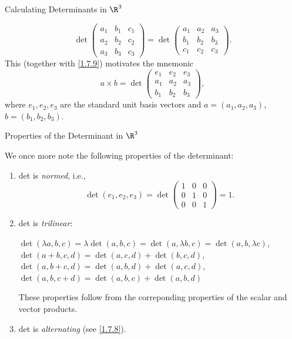 \documentclass[smaller,hyperref={CJKbookmarks=true}]{beamer}
\begin{document}
\begin{frame}{Calculating Determinants in $\R^3$}
\begin{spacing}{1}
\[\det\begin{pmatrix}
        a_1 & b_1 & c_1 \\
        a_2 & b_2 & c_2 \\
        a_3 & b_3 & c_3
      \end{pmatrix}=\det\begin{pmatrix}
                          a_1 & a_2 & a_3\\
                          b_1 & b_2 & b_3\\
                          c_1 & c_2 & c_3
                        \end{pmatrix}.\]
This (together with \eqref{1.7.9}) motivates the mnemonic
\[a\times b=\det\begin{pmatrix}
                  e_1 & e_2 & e_3 \\
                  a_1 & a_2 & a_3 \\
                  b_1 & b_2 & b_3
                \end{pmatrix},\]
where $e_1,e_2,e_3$ are the standard unit basis vectors and $a=(a_1,a_2,a_3)$,\\$b=(b_1,b_2,b_3)$.
\end{spacing}
\end{frame}
\begin{frame}[t]{Properties of the Determinant in $\R^3$}
\begin{spacing}{1.1}
We once more note the following properties of the determinant:
\begin{enumerate}[1.]
  \item det is \emph{normed}, i.e.,
  \[\det(e_1,e_2,e_3)=\det\begin{pmatrix}
                            1 & 0 & 0\\
                             0& 1 & 0\\
                            0 & 0 & 1
                          \end{pmatrix}=1.\]
  \item det is \emph{trilinear}:
  \begin{center}
    $\det(\lambda a,b,c)=\lambda\det(a,b,c)=\det(a,\lambda b,c)=\det(a,b,\lambda c)$,\\
    $\det(a+b,c,d)=\det(a,c,d)+\det(b,c,d)$,\\
    $\det(a,b+c,d)=\det(a,b,d)+\det(a,c,d)$,\\
    $\det(a,b,c+d)=\det(a,b,c)+\det(a,b,d)$
  \end{center}
  These properties follow from the correponding properties of the scalar and vector products.
  \item det is \emph{alternating} (see \eqref{1.7.8}).
\end{enumerate}
\end{spacing}
\end{frame}
\end{document}
